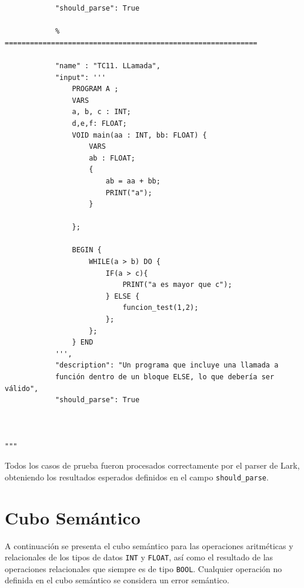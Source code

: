 \documentclass[12pt, letterpaper]{article}
\theoremstyle{definition}
\begin{document}
\begin{verbatim}
            "should_parse": True
    
            % ============================================================

            "name" : "TC11. LLamada",
            "input": '''
                PROGRAM A ;
                VARS 
                a, b, c : INT;
                d,e,f: FLOAT;
                VOID main(aa : INT, bb: FLOAT) {                    
                    VARS
                    ab : FLOAT;
                    {                        
                        ab = aa + bb;
                        PRINT("a");
                    }
                    
                }; 
                                
                BEGIN { 
                    WHILE(a > b) DO {
                        IF(a > c){
                            PRINT("a es mayor que c");
                        } ELSE {
                            funcion_test(1,2);
                        };
                    };
                } END
            ''',
            "description": "Un programa que incluye una llamada a 
            función dentro de un bloque ELSE, lo que debería ser válido",
            "should_parse": True
        


"""
\end{verbatim}    

Todos los casos de prueba fueron procesados correctamente por el parser de Lark, obteniendo los resultados esperados definidos en el campo \texttt{should\_parse}.

\section{Cubo Semántico}

A continuación se presenta el cubo semántico para las operaciones aritméticas y relacionales de los tipos de datos \texttt{INT} y \texttt{FLOAT}, así como el resultado de las operaciones relacionales que siempre es de tipo \texttt{BOOL}. Cualquier operación no definida en el cubo semántico se considera un error semántico.
\end{document}
